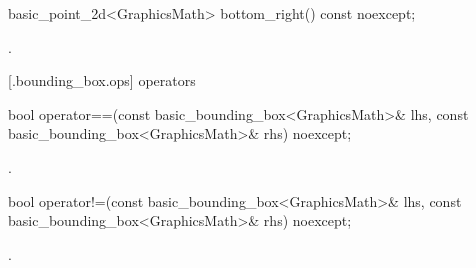 %
\begin{itemdecl}
basic_point_2d<GraphicsMath> bottom_right() const noexcept;
\end{itemdecl}
\begin{itemdescr}
\pnum
\returns
{}.
\end{itemdescr}

 [\iotwod.bounding_box.ops] { operators}

%
\begin{itemdecl}
bool operator==(const basic_bounding_box<GraphicsMath>& lhs,
  const basic_bounding_box<GraphicsMath>& rhs) noexcept;
\end{itemdecl}
\begin{itemdescr}
\pnum
\returns
{}.
\end{itemdescr}

%
\begin{itemdecl}
bool operator!=(const basic_bounding_box<GraphicsMath>& lhs,
  const basic_bounding_box<GraphicsMath>& rhs) noexcept;
\end{itemdecl}
\begin{itemdescr}
\pnum
\returns
{}.
\end{itemdescr}
